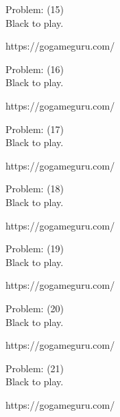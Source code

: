 \documentclass[11pt]{article}
\begin{document}
\begin{minipage}[t]{0.5\textwidth}
  {\centering
  
  Problem: (15)\\
  Black to play.

https://gogameguru.com/\\
  }
\end{minipage}
\begin{minipage}[t]{0.5\textwidth}
  {\centering
  
  Problem: (16)\\
  Black to play.

https://gogameguru.com/\\
  }
\end{minipage}
\begin{minipage}[t]{0.5\textwidth}
  {\centering
  
  Problem: (17)\\
  Black to play.

https://gogameguru.com/\\
  }
\end{minipage}
\begin{minipage}[t]{0.5\textwidth}
  {\centering
  
  Problem: (18)\\
  Black to play.

https://gogameguru.com/\\
  }
\end{minipage}
\begin{minipage}[t]{0.5\textwidth}
  {\centering
  
  Problem: (19)\\
  Black to play.

https://gogameguru.com/\\
  }
\end{minipage}
\begin{minipage}[t]{0.5\textwidth}
  {\centering
  
  Problem: (20)\\
  Black to play.

https://gogameguru.com/\\
  }
\end{minipage}
\begin{minipage}[t]{0.5\textwidth}
  {\centering
  
  Problem: (21)\\
  Black to play.

https://gogameguru.com/\\
  }
\end{minipage}
\end{document}
